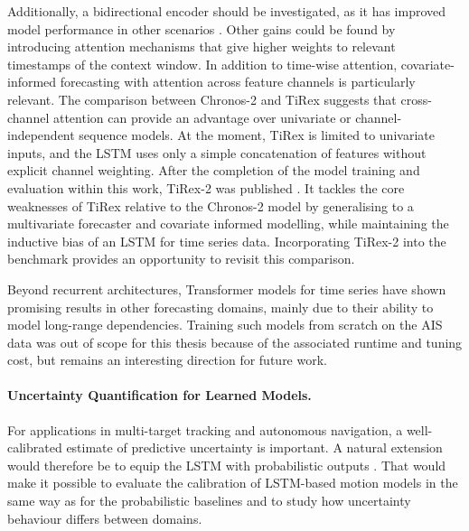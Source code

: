 Additionally, a bidirectional encoder should be investigated, as it has improved model performance in other scenarios \parencite{articlebilstmsus}.
Other gains could be found by introducing attention mechanisms that give higher weights to relevant timestamps of the context window. 
In addition to time-wise attention, covariate-informed forecasting with attention across feature channels is particularly relevant.
The comparison between Chronos-2 and TiRex suggests that cross-channel attention can provide an advantage over univariate or channel-independent sequence models. 
At the moment, TiRex is limited to univariate inputs, and the \ac{LSTM} uses only a simple concatenation of features without explicit channel weighting.
After the completion of the model training and evaluation within this work, TiRex-2 was published \parencite{podest2026tirex2generalizingtirexmultivariate}. It tackles the core weaknesses of TiRex relative to the Chronos-2 model by generalising to a multivariate forecaster and covariate informed modelling, while maintaining the inductive bias of an \ac{LSTM} for time series data. Incorporating TiRex-2 into the benchmark provides an opportunity to revisit this comparison.

Beyond recurrent architectures, Transformer models for time series have shown promising results in other forecasting domains, mainly due to their ability to model long-range dependencies.
Training such models from scratch on the AIS data was out of scope for this thesis because of the associated runtime and tuning cost, but remains an interesting direction for future work. 






\paragraph{Uncertainty Quantification for Learned Models.}
 For applications in multi-target tracking and autonomous navigation, a well-calibrated estimate of predictive uncertainty is important. A natural extension would therefore be to equip the LSTM with probabilistic outputs%
 . That would make it possible to evaluate the calibration of LSTM-based motion models in the same way as for the probabilistic baselines and to study how uncertainty behaviour differs between domains.



